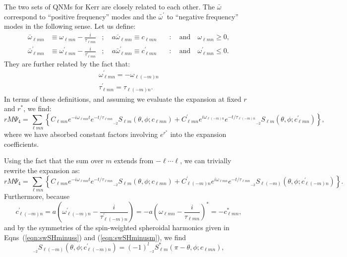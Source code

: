 \documentclass[11pt]{article}
\newcommand{\swSH}[5][]{{}_{{}_{#2}}S^{#1}_{#3}(#4;#5)}
\begin{document}
The two sets of QNMs for Kerr are closely related to each other.  The $\bar\omega$ correspond to ``positive frequency'' modes and the $\bar\omega^\prime$ to ``negative frequency'' modes in the following sense.  Let us define:
\begin{align}
    \bar\omega_{\ell{m}n} &\equiv 
    \omega_{\ell{m}n} - \frac{i}{\tau_{\ell{m}n}}
      &;\quad a\bar\omega_{\ell{m}n}\equiv c_{\ell{m}n}
    &\quad:\quad\mbox{and}\quad \omega_{\ell{m}n} \ge 0, \\
    \bar\omega^\prime_{\ell{m}n} &\equiv 
    \omega^\prime_{\ell{m}n} - \frac{i}{\tau^\prime_{\ell{m}n}}
      &;\quad a\bar\omega^\prime_{\ell{m}n}\equiv c^\prime_{\ell{m}n}
    &\quad:\quad\mbox{and}\quad \omega^\prime_{\ell{m}n} \le 0.
\end{align}
They are further related by the fact that:
\begin{align}
\omega^\prime_{\ell{m}n} = -\omega_{\ell(-m)n} \\
\tau^\prime_{\ell{m}n} = \tau_{\ell(-m)n}.
\end{align} 
In terms of these definitions, and assuming we evaluate the expansion at fixed $r$ and $r^*$, we find:
\begin{equation}
rM\Psi_4 = \sum_{\ell{m}n} \left\{ C_{\ell{m}n} e^{-i\omega_{\ell{m}n}t}e^{-t/\tau_{\ell{m}n}} \swSH{\minus 2}{\ell{m}}{\theta,\phi}{c_{\ell{m}n}} + C^\prime_{\ell{m}n} e^{i\omega_{\ell(-m)n}}e^{-t/\tau_{\ell(-m)n}} \swSH{\minus 2}{\ell{m}}{\theta,\phi}{c^\prime_{\ell{m}n}} \right\},
\end{equation}
where we have absorbed constant factors involving $e^{r^*}$ into the
expansion coefficients.

Using the fact that the sum over $m$ extends from $-\ell\cdots\ell$, we can trivially rewrite the expansion as:
\begin{equation}
rM\Psi_4 = \sum_{\ell{m}n} \left\{ C_{\ell{m}n} e^{-i\omega_{\ell{m}n}t}e^{-t/\tau_{\ell{m}n}} \swSH{\minus 2}{\ell{m}}{\theta,\phi}{c_{\ell{m}n}} + C^\prime_{\ell(-m)n} e^{i\omega_{\ell{m}n}}e^{-t/\tau_{\ell{m}n}} \swSH{\minus 2}{\ell(-m)}{\theta,\phi}{c^\prime_{\ell(-m)n}} \right\}.
\end{equation}
Furthermore, because
\begin{equation}
c^\prime_{\ell(-m)n} = a\left(\omega^\prime_{\ell(-m)n} 
               - \frac{i}{\tau^\prime_{\ell(-m)n}}\right) =
               -a\left(\omega_{\ell{m}n} 
               - \frac{i}{\tau_{\ell{m}n}}\right)^* = -c^*_{\ell{m}n},
\end{equation}
and by the symmetries of the spin-weighted spheroidal harmonics given in Eqns~(\ref{eqn:swSHminuss}) and (\ref{eqn:swSHminusm}), we find
\begin{equation}
\swSH{\minus 2}{\ell(-m)}{\theta,\phi}{c^\prime_{\ell(-m)n}} = (-1)^l \swSH[*]{\minus 2}{\ell{m}}{\pi-\theta,\phi}{c_{\ell{m}n}},
\end{equation}
\end{document}
